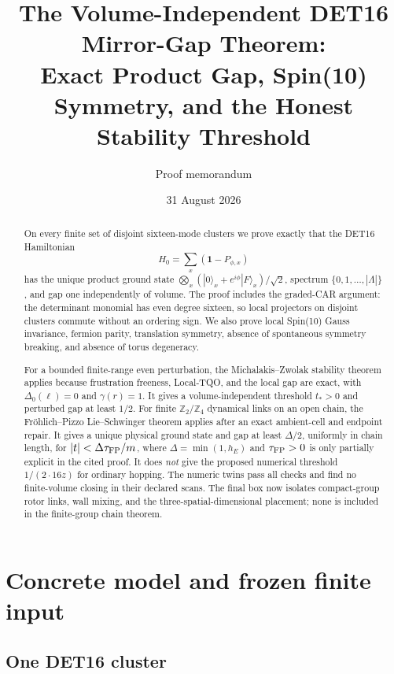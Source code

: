 \documentclass[11pt]{article}
\title{The Volume-Independent DET16 Mirror-Gap Theorem:\\
Exact Product Gap, Spin(10) Symmetry, and the Honest Stability Threshold}
\author{Proof memorandum}
\date{31 August 2026}
\theoremstyle{remark}
\newcommand{\id}{\mathbf 1}
\begin{document}
\maketitle

\begin{abstract}
On every finite set of disjoint sixteen-mode clusters we prove exactly
that the DET16 Hamiltonian
\[
 H_0=\sum_x(\id-P_{\phi,x})
\]
has the unique product ground state
$\bigotimes_x(|0\rangle_x+e^{i\phi}|F\rangle_x)/\sqrt2$, spectrum
$\{0,1,\ldots,|\Lambda|\}$, and gap one independently of volume.
The proof includes the graded-CAR argument: the determinant monomial has
even degree sixteen, so local projectors on disjoint clusters commute
without an ordering sign.  We also prove local Spin(10) Gauss invariance,
fermion parity, translation symmetry, absence of spontaneous symmetry
breaking, and absence of torus degeneracy.

For a bounded finite-range even perturbation, the
Michalakis--Zwolak stability theorem applies because frustration
freeness, Local-TQO, and the local gap are exact, with
$\Delta_0(\ell)=0$ and $\gamma(r)=1$.  It gives a
volume-independent threshold $t_*>0$ and perturbed gap at least $1/2$.
For finite $\mathbb Z_2/\mathbb Z_4$ dynamical links on an open chain,
the Fröhlich--Pizzo Lie--Schwinger theorem applies after an exact
ambient-cell and endpoint repair.  It gives a unique physical ground
state and gap at least $\Delta/2$, uniformly in chain length, for
$|t|<\Delta\tau_{\rm FP}/m$, where
$\Delta=\min(1,h_E)$ and $\tau_{\rm FP}>0$ is only partially explicit
in the cited proof.  It does \emph{not} give the proposed numerical
threshold $1/(2\cdot16z)$ for ordinary hopping.  The numeric twins pass
all checks and find no finite-volume closing in their declared scans.
The final box now isolates compact-group rotor links, wall mixing, and
the three-spatial-dimensional placement; none is included in the
finite-group chain theorem.
\end{abstract}

\tableofcontents

\section{Concrete model and frozen finite input}

\subsection{One DET16 cluster}
\end{document}
